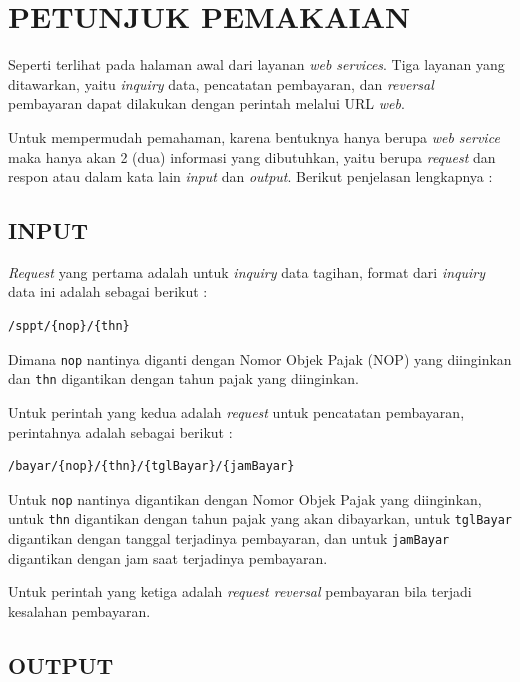 \documentclass[pdftex,12pt, oneside]{article}
\begin{document}
\section{PETUNJUK PEMAKAIAN}

Seperti terlihat pada halaman awal dari layanan \textit{web services}. Tiga layanan yang ditawarkan, yaitu \textit{inquiry} data, pencatatan pembayaran, dan \textit{reversal} pembayaran dapat dilakukan dengan perintah melalui URL \textit{web}.

Untuk mempermudah pemahaman, karena bentuknya hanya berupa \textit{web service} maka hanya akan 2 (dua) informasi yang dibutuhkan, yaitu berupa \textit{request} dan respon atau dalam kata lain \textit{input} dan \textit{output}. Berikut penjelasan lengkapnya :

\subsection{INPUT}

\textit{Request} yang pertama adalah untuk \textit{inquiry} data tagihan, format dari \textit{inquiry} data ini adalah sebagai berikut :

\begin{lstlisting}
/sppt/{nop}/{thn}
\end{lstlisting}

Dimana \texttt{nop} nantinya diganti dengan Nomor Objek Pajak (NOP) yang diinginkan dan \texttt{thn} digantikan dengan tahun pajak yang diinginkan.

Untuk perintah yang kedua adalah \textit{request} untuk pencatatan pembayaran, perintahnya adalah sebagai berikut :

\begin{lstlisting}
/bayar/{nop}/{thn}/{tglBayar}/{jamBayar}
\end{lstlisting}

Untuk \texttt{nop} nantinya digantikan dengan Nomor Objek Pajak yang diinginkan, untuk \texttt{thn} digantikan dengan tahun pajak yang akan dibayarkan, untuk \texttt{tglBayar} digantikan dengan tanggal terjadinya pembayaran, dan untuk \texttt{jamBayar} digantikan dengan jam saat terjadinya pembayaran.

Untuk perintah yang ketiga adalah \textit{request reversal} pembayaran bila terjadi kesalahan pembayaran.

\subsection{OUTPUT}
\end{document}
